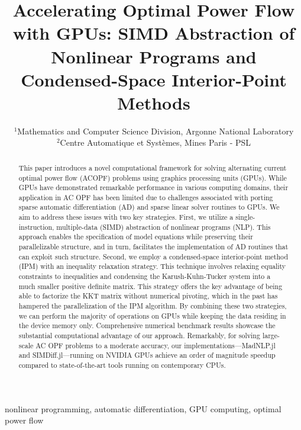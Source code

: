 % 
\title{Accelerating Optimal Power Flow with GPUs: SIMD Abstraction of Nonlinear Programs and Condensed-Space Interior-Point Methods
}


\date{\small
  $^{1}$Mathematics and Computer Science Division, Argonne National Laboratory\\
  $^{2}$Centre Automatique et Syst\`{e}mes, Mines Paris - PSL
}

\maketitle
\begin{abstract}
  This paper introduces a novel computational framework for solving
alternating current optimal power flow (ACOPF) problems using
graphics processing units (GPUs). While GPUs have demonstrated
remarkable performance in various computing domains, their application
in AC OPF has been limited due to challenges associated with porting
sparse automatic differentiation (AD) and sparse linear solver
routines to GPUs. We aim to address these issues with two key
strategies. First, we utilize a single-instruction, multiple-data
(SIMD) abstraction of nonlinear programs (NLP). This approach enables
the specification of model equations while preserving their
parallelizable structure, and in turn, facilitates the implementation
of AD routines that can exploit such structure. Second, we employ a
condensed-space interior-point method (IPM) with an inequality
relaxation strategy. This technique involves relaxing equality
constraints to inequalities and condensing the Karush-Kuhn-Tucker
system into a much smaller positive definite matrix. This strategy
offers the key advantage of being able to factorize the KKT matrix
without numerical pivoting, which in the past has hampered the parallelization of
the IPM algorithm. By combining these two strategies, we can perform the
majority of operations on GPUs while keeping the data residing in the
device memory only. Comprehensive numerical benchmark results showcase
the substantial computational advantage of our approach. Remarkably,
for solving large-scale AC OPF problems to a moderate accuracy, our
implementations—MadNLP.jl and SIMDiff.jl—running on NVIDIA GPUs
achieve an order of magnitude speedup compared to state-of-the-art
tools running on contemporary CPUs.
\end{abstract}

\begin{IEEEkeywords}
  nonlinear programming, automatic differentiation, GPU computing, optimal power flow
\end{IEEEkeywords}
